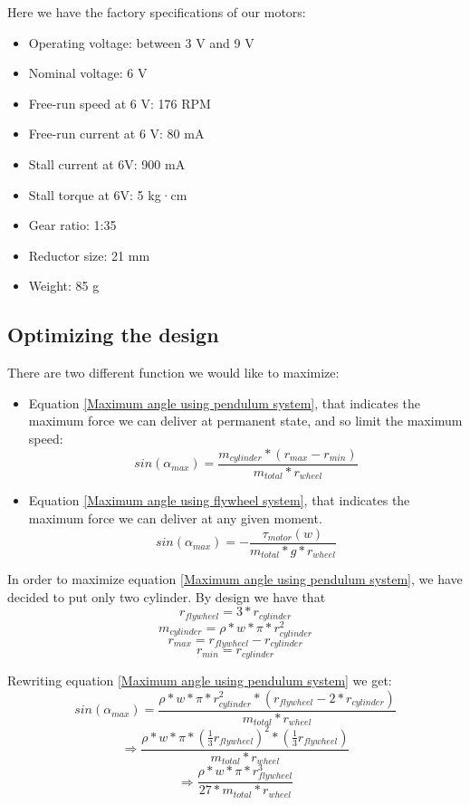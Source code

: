 Here we have the factory specifications of our motors: 
\begin{itemize}
    \item Operating voltage: between 3 V and 9 V
    \item Nominal voltage: 6 V
    \item Free-run speed at 6 V: 176 RPM
    \item Free-run current at 6 V: 80 mA
    \item Stall current at 6V: 900 mA
    \item Stall torque at 6V: 5 kg·cm
    \item Gear ratio: 1:35
    \item Reductor size: 21 mm
    \item Weight: 85 g
\end{itemize}

\subsection{Optimizing the design}
There are two different function we would like to maximize:
\begin{itemize}
    \item Equation \ref{Maximum angle using pendulum system}, that indicates the maximum force we can deliver at permanent state, and so limit the maximum speed:
     \[sin(\alpha_{max}) = \frac{m_{cylinder} * (r_{max}- r_{min})}{m_{total} * r_{wheel}}\]
     \item Equation \ref{Maximum angle using flywheel system}, that indicates the maximum force we can deliver at any given moment.
     \[sin(\alpha_{max}) = - \frac{\tau_{motor} (w)}{m_{total} * g * r_{wheel}} \]
\end{itemize}

In order to maximize equation \ref{Maximum angle using pendulum system}, we have decided to put only two cylinder.
By design we have that
\[r_{flywheel} = 3 * r_{cylinder}\]
\[m_{cylinder} = \rho * w * \pi * r_{cylinder}^2 \]
\[r_{max} = r_{flywheel} - r_{cylinder}\]
\[r_{min} = r_{cylinder}\]


Rewriting equation \ref{Maximum angle using pendulum system} we get:
\[sin(\alpha_{max}) = \frac{\rho * w * \pi * r_{cylinder}^2 * (r_{flywheel} - 2 * r_{cylinder})}{m_{total} * r_{wheel}}\]
\[\Rightarrow \frac{\rho * w * \pi * (\frac{1}{3} r_{flywheel})^2 * (\frac{1}{3} r_{flywheel})}{m_{total} * r_{wheel}} \]
\[\Rightarrow \frac{\rho * w * \pi * r_{flywheel}^3}{27 * m_{total} * r_{wheel}}\]

